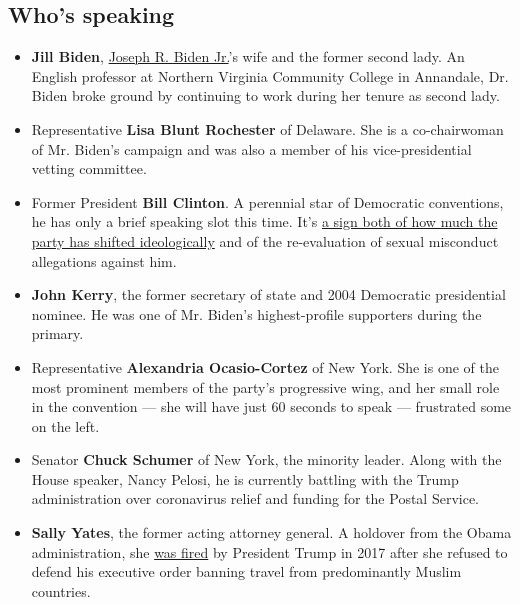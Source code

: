 \hypertarget{whos-speaking}{%
\subsection{Who's speaking}\label{whos-speaking}}

\begin{itemize}
\item
  \textbf{Jill Biden},
  \href{https://www.nytimes3xbfgragh.onion/interactive/2020/us/elections/joe-biden.html}{Joseph
  R. Biden Jr.}'s wife and the former second lady. An English professor
  at Northern Virginia Community College in Annandale, Dr. Biden broke
  ground by continuing to work during her tenure as second lady.
\item
  Representative \textbf{Lisa Blunt Rochester} of Delaware. She is a
  co-chairwoman of Mr. Biden's campaign and was also a member of his
  vice-presidential vetting committee.
\item
  Former President \textbf{Bill Clinton}. A perennial star of Democratic
  conventions, he has only a brief speaking slot this time. It's
  \href{https://www.nytimes3xbfgragh.onion/2020/08/18/us/politics/bill-clinton-convention.html}{a
  sign both of how much the party has shifted ideologically} and of the
  re-evaluation of sexual misconduct allegations against him.
\item
  \textbf{John Kerry}, the former secretary of state and 2004 Democratic
  presidential nominee. He was one of Mr. Biden's highest-profile
  supporters during the primary.
\item
  Representative \textbf{Alexandria Ocasio-Cortez} of New York. She is
  one of the most prominent members of the party's progressive wing, and
  her small role in the convention --- she will have just 60 seconds to
  speak --- frustrated some on the left.
\item
  Senator \textbf{Chuck Schumer} of New York, the minority leader. Along
  with the House speaker, Nancy Pelosi, he is currently battling with
  the Trump administration over coronavirus relief and funding for the
  Postal Service.
\item
  \textbf{Sally Yates}, the former acting attorney general. A holdover
  from the Obama administration, she
  \href{https://www.nytimes3xbfgragh.onion/2017/01/30/us/politics/trump-immigration-ban-memo.html}{was
  fired} by President Trump in 2017 after she refused to defend his
  executive order banning travel from predominantly Muslim countries.
\end{itemize}

